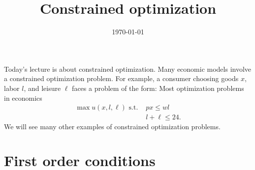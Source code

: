 \documentclass[12pt,reqno]{amsart}
\title{Constrained optimization}
\date{\today}
\theoremstyle{definition}
\begin{document}
\maketitle

Today's lecture is about constrained optimization. Many economic
models involve a constrained optimization problem. For example, a
consumer choosing goods $x$, labor $l$, and leisure $\ell$ faces a
problem of the form:
Most optimization
problems in economics 
\begin{align*} 
  \max u(x,l,\ell) \text{ s.t. } & px \leq wl \\
  & l + \ell \leq 24.
\end{align*}
We will see many other examples of constrained optimization problems. 

\section{First order conditions}
\end{document}
